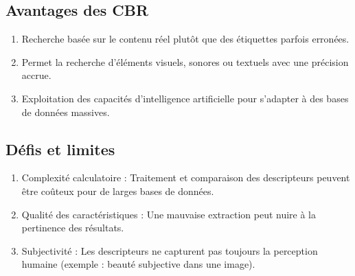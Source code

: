 \begin{section}
\section{Avantages des CBR}
\begin{enumerate}
    \item Recherche basée sur le contenu réel plutôt que des étiquettes parfois erronées.
    \item Permet la recherche d'éléments visuels, sonores ou textuels avec une précision accrue.
    \item Exploitation des capacités d’intelligence artificielle pour s’adapter à des bases de données massives.
\end{enumerate}

\section{Défis et limites}
\begin{enumerate}
    \item Complexité calculatoire : Traitement et comparaison des descripteurs peuvent être coûteux pour de larges bases de données.
    \item Qualité des caractéristiques : Une mauvaise extraction peut nuire à la pertinence des résultats.
    \item Subjectivité : Les descripteurs ne capturent pas toujours la perception humaine (exemple : beauté subjective dans une image).
\end{enumerate}
\end{section}